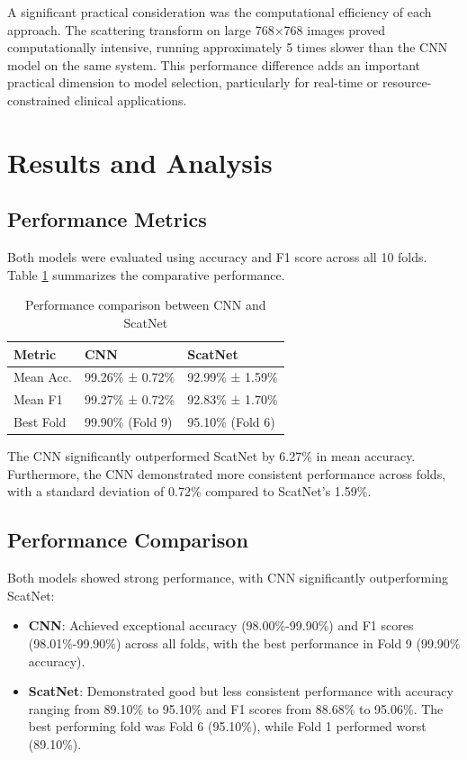 \documentclass[10pt,twocolumn]{article}
\begin{document}
A significant practical consideration was the computational efficiency of each approach. The scattering transform on large 768×768 images proved computationally intensive, running approximately 5 times slower than the CNN model on the same system. This performance difference adds an important practical dimension to model selection, particularly for real-time or resource-constrained clinical applications.

\section{Results and Analysis}
\subsection{Performance Metrics}
Both models were evaluated using accuracy and F1 score across all 10 folds. Table \ref{tab:performance} summarizes the comparative performance.

\begin{table}[h]
\centering
\caption{Performance comparison between CNN and ScatNet}
\label{tab:performance}
\begin{tabular}{lll}
\toprule
Metric & CNN & ScatNet \\
\midrule
Mean Acc. & 99.26\% ± 0.72\% & 92.99\% ± 1.59\% \\
Mean F1 & 99.27\% ± 0.72\% & 92.83\% ± 1.70\% \\
Best Fold & 99.90\% (Fold 9) & 95.10\% (Fold 6) \\
\bottomrule
\end{tabular}
\end{table}

The CNN significantly outperformed ScatNet by 6.27\% in mean accuracy. Furthermore, the CNN demonstrated more consistent performance across folds, with a standard deviation of 0.72\% compared to ScatNet's 1.59\%.

\subsection{Performance Comparison}
Both models showed strong performance, with CNN significantly outperforming ScatNet:

\begin{itemize}
    \item \textbf{CNN}: Achieved exceptional accuracy (98.00\%-99.90\%) and F1 scores (98.01\%-99.90\%) across all folds, with the best performance in Fold 9 (99.90\% accuracy).
    
    \item \textbf{ScatNet}: Demonstrated good but less consistent performance with accuracy ranging from 89.10\% to 95.10\% and F1 scores from 88.68\% to 95.06\%. The best performing fold was Fold 6 (95.10\%), while Fold 1 performed worst (89.10\%).
\end{itemize}
\end{document}
